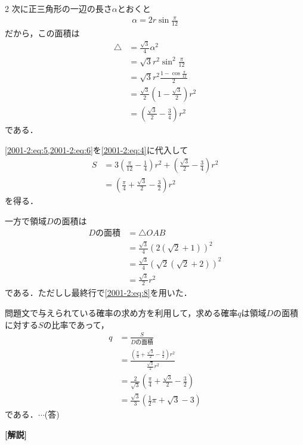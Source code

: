 \documentclass[../../../../main.tex]{subfiles}
\begin{document}
\begin{multicols}{2}
  次に正三角形の一辺の長さ$\alpha$とおくと
  \begin{align*}
    \alpha = 2r \sin\frac{\pi}{12}
  \end{align*}
  だから，この面積は
  \begin{align}
    \triangle
     & = \frac{\sqrt{3}}{4}\alpha^2                                         \\
     & = \sqrt{3}r^2\sin^2\frac{\pi}{12}                                    \\
     & = \sqrt{3}r^2\frac{1-\cos\frac{\pi}{12}}{2}                          \\
     & = \frac{\sqrt{3}}{2}\left(1-\frac{\sqrt{3}}{2}\right)r^2             \\
     & = \left(\frac{\sqrt{3}}{2}-\frac{3}{4}\right)r^2 \label{2001-2:eq:6}
  \end{align}
  である．

  \cref{2001-2:eq:5,2001-2:eq:6}を\cref{2001-2:eq:4}に代入して
  \begin{align}
    S
     & = 3\left(\frac{\pi}{12}-\frac{1}{4}\right)r^2 +\left(\frac{\sqrt{3}}{2}-\frac{3}{4}\right)r^2 \\
     & = \left(\frac{\pi}{4} + \frac{\sqrt{3}}{2}-\frac{3}{2}\right)r^2 \label{2001-2:eq:7}
  \end{align}
  を得る．

  一方で領域$D$の面積は
  \begin{align*}
    D\text{の面積}
     & = \triangle OAB                              \\
     & = \frac{\sqrt{3}}{4}(2(\sqrt{2}+1))^2        \\
     & = \frac{\sqrt{3}}{4}(\sqrt{2}(\sqrt{2}+2))^2 \\
     & = \frac{\sqrt{3}}{2}r^2
  \end{align*}
  である．ただしし最終行で\cref{2001-2:eq:8}を用いた．

  問題文で与えられている確率の求め方を利用して，求める確率$q$は領域$D$の面積に対する$S$の比率であって，
  \begin{align*}
    q
     & = \frac{S}{D\text{の面積}}                                                                          \\
     & = \frac{\left(\frac{\pi}{4} + \frac{\sqrt{3}}{2} - \frac{3}{2}\right)r^2}{\frac{\sqrt{3}}{2}r^2} \\
     & = \frac{2}{\sqrt{3}} \left(\frac{\pi}{4} + \frac{\sqrt{3}}{2} - \frac{3}{2}\right)               \\
     & = \frac{\sqrt{3}}{3}\left(\frac{1}{2}\pi + \sqrt{3} - 3\right)
  \end{align*}
  である．$\cdots$(答)
  \vspace{10pt}

  {\bf[解説]}

  \newpage
\end{multicols}
\end{document}
